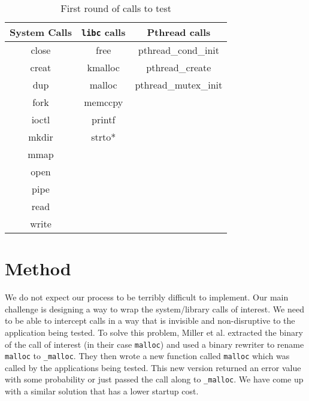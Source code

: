 \documentclass[10pt]{article}
\newenvironment{allintypewriter}{\ttfamily}{\par}
\begin{document}
\begin{table}
	\centering
	\caption{First round of calls to test}
	\begin{allintypewriter}
	\begin{tabular}{|c |c | c|}
	\hline
	System Calls & \texttt{libc} calls & Pthread calls \\ \hline \hline
	close & free& pthread\_cond\_init\\ 
	creat & kmalloc& pthread\_create\\
	dup & malloc&pthread\_mutex\_init\\
	fork & memccpy&\\
	ioctl & printf&\\
	mkdir & strto*&\\
	mmap & &\\
 	open & &\\
	pipe & &\\
	read & &\\
	write & &\\ \hline
	\end{tabular}
	\end{allintypewriter}
\end{table}

\section{Method}
We do not expect our process to be terribly difficult to implement. Our main challenge is designing a way to wrap the system/library calls of interest. We need to be able to intercept calls in a way that is invisible and non-disruptive to the application being tested. To solve this problem, Miller et al. extracted the binary of the call of interest (in their case \texttt{malloc}) and used a binary rewriter to rename \texttt{malloc} to \texttt{\_malloc}. They then wrote a new function called \texttt{malloc} which was called by the applications being tested. This new version returned an error value with some probability or just passed the call along to \texttt{\_malloc}. We have come up with a similar solution that has a lower startup cost.
\end{document}
